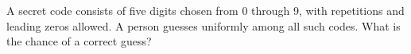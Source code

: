 A secret code consists of five digits chosen from 0 through 9, with repetitions and leading zeros allowed. A person guesses uniformly among all such codes. What is the chance of a correct guess?
